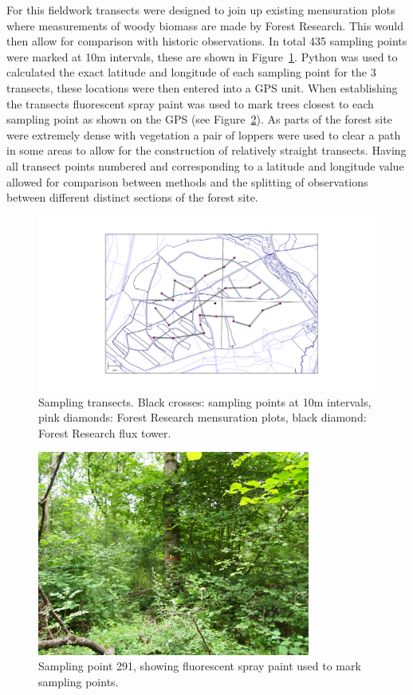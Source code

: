 \documentclass[11pt]{article}
\begin{document}
For this fieldwork transects were designed to join up existing mensuration plots where measurements of woody biomass are made by Forest Research. This would then allow for comparison with historic observations. In total 435 sampling points were marked at 10m intervals, these are shown in Figure~\ref{fig:transects}. Python was used to calculated the exact latitude and longitude of each sampling point for the 3 transects, these locations were then entered into a GPS unit. When establishing the transects fluorescent spray paint was used to mark trees closest to each sampling point as shown on the GPS (see Figure~\ref{fig:pink_tree}). As parts of the forest site were extremely dense with vegetation a pair of loppers were used to clear a path in some areas to allow for the construction of relatively straight transects. Having all transect points numbered and corresponding to a latitude and longitude value allowed for comparison between methods and the splitting of observations between different distinct sections of the forest site. 


\begin{figure}[ht]
    \centering
    \includegraphics[width=\textwidth]{straitsmap_threet_10m.png}
    \caption{Sampling transects. Black crosses: sampling points at 10m intervals, pink diamonds: Forest Research mensuration plots, black diamond: Forest Research flux tower.} \label{fig:transects}
\end{figure}

\begin{figure}[ht]
    \centering
    \includegraphics[width=0.8\textwidth]{291E.jpg}
    \caption{Sampling point 291, showing fluorescent spray paint used to mark sampling points.} \label{fig:pink_tree}
\end{figure}
\end{document}

